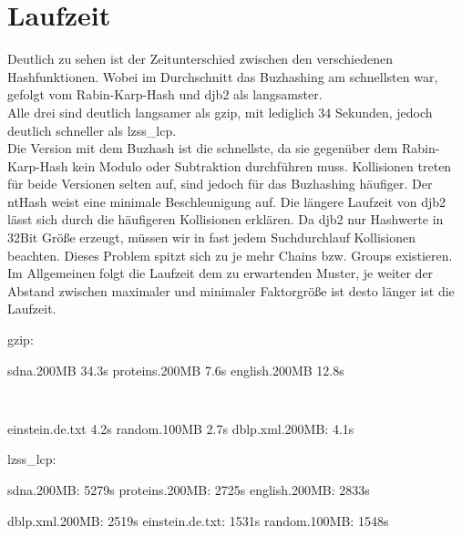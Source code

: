 \section{Laufzeit}

Deutlich zu sehen ist der Zeitunterschied zwischen den verschiedenen Hashfunktionen. Wobei im Durchschnitt das Buzhashing am schnellsten war, gefolgt vom Rabin-Karp-Hash und djb2 als langsamster.\\
Alle drei sind deutlich langsamer als gzip, mit lediglich 34 Sekunden, jedoch deutlich schneller als lzss\_lcp.\\
Die Version mit dem Buzhash ist die schnellste, da sie gegenüber dem Rabin-Karp-Hash kein Modulo oder Subtraktion  durchführen muss. Kollisionen treten für beide Versionen selten auf, sind jedoch für das Buzhashing häufiger.
Der ntHash weist eine minimale Beschleunigung auf.
Die längere Laufzeit von djb2 lässt sich durch die häufigeren Kollisionen erklären. Da djb2 nur Hashwerte in 32Bit Größe erzeugt, müssen wir in fast jedem Suchdurchlauf Kollisionen beachten. Dieses Problem spitzt sich zu je mehr Chains bzw. Groups existieren.\\
Im Allgemeinen folgt die Laufzeit dem zu erwartenden Muster, je weiter der Abstand zwischen maximaler und minimaler Faktorgröße ist desto länger ist die Laufzeit.

\begin{multicols}{2}
	gzip: 
	\begin{outline}
	\1[]
	\2[] sdna.200MB  34.3s
	\2[] proteins.200MB 7.6s
	\2[] english.200MB 12.8s
	\end{outline}
\columnbreak
\texttt{  }
\begin{outline}
	\1[]
	\2[] einstein.de.txt 4.2s
	\2[] random.100MB 2.7s
	\2[] dblp.xml.200MB: 4.1s
\end{outline}
\end{multicols}

lzss\_lcp:
\begin{multicols}{2}
	\begin{outline}
		\1[]
		\2[] sdna.200MB:  5279s
		\2[] proteins.200MB: 2725s
		\2[] english.200MB: 2833s
	\end{outline}
	\columnbreak
	\begin{outline}
		\1[]
		\2[] dblp.xml.200MB: 2519s
		\2[] einstein.de.txt: 1531s
		\2[] random.100MB: 1548s
	\end{outline}
\end{multicols}


